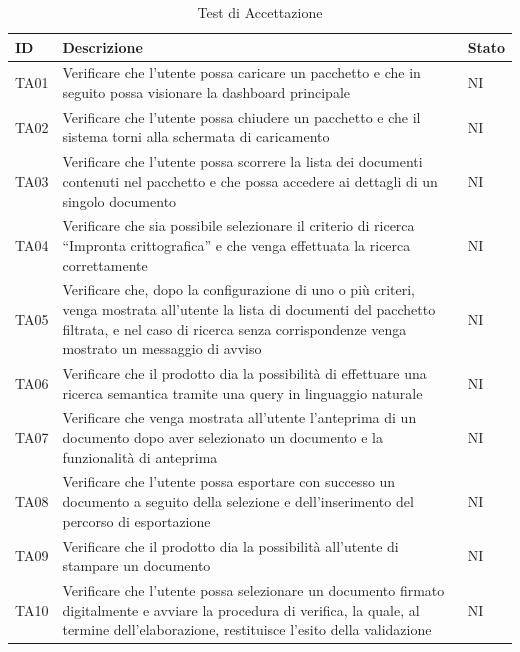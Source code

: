\documentclass[a4paper,12pt]{article}
\begin{document}
            \begin{longtable}{|M{1.5cm}|M{8.5cm}|M{2cm}|}

                \caption{Test di Accettazione} \\
                \hline
                \textbf{ID} & \textbf{Descrizione} & \textbf{Stato} \\
                \hline
                \endhead

                TA01 & Verificare che l'utente possa caricare un pacchetto e che in seguito possa visionare la dashboard principale & NI \\
                \hline
                
                TA02 & Verificare che l'utente possa chiudere un pacchetto e che il sistema torni alla schermata di caricamento & NI \\
                \hline

                TA03 & Verificare che l’utente possa scorrere la lista dei documenti contenuti nel pacchetto e che possa accedere ai dettagli di un singolo documento & NI \\
                \hline
                
                TA04 & Verificare che sia possibile selezionare il criterio di ricerca “Impronta crittografica” e che venga effettuata la ricerca correttamente & NI \\
                \hline

                TA05 & Verificare che, dopo la configurazione di uno o più criteri, venga mostrata all'utente la lista di documenti del pacchetto filtrata, e nel caso di ricerca senza corrispondenze venga mostrato un messaggio di avviso & NI \\
                \hline
                
                TA06 & Verificare che il prodotto dia la possibilità di effettuare una ricerca semantica tramite una query in linguaggio naturale & NI \\
                \hline

                TA07 & Verificare che venga mostrata all’utente l’anteprima di un documento dopo aver selezionato un documento e la funzionalità di anteprima & NI \\
                \hline
                
                TA08 & Verificare che l’utente possa esportare con successo un documento a seguito della selezione e dell’inserimento del percorso di esportazione & NI \\
                \hline

                TA09 & Verificare che il prodotto dia la possibilità all’utente di stampare un documento & NI \\
                \hline

                TA10 & Verificare che l’utente possa selezionare un documento firmato digitalmente e avviare la procedura di verifica, la quale, al termine dell’elaborazione, restituisce l’esito della validazione & NI \\
                \hline

            \end{longtable}
\end{document}
